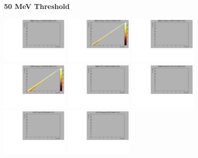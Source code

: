 \textbf{50 MeV Threshold}

\begin{center}

  \includegraphics[width=0.245\textwidth]{plots/response_matrix/Proton_KE_RHC_CC1Pi_50MeV.pdf}
  \includegraphics[width=0.245\textwidth]{plots/response_matrix/PiPlus_KE_RHC_CC1Pi_50MeV.pdf}
  \includegraphics[width=0.245\textwidth]{plots/response_matrix/PiMinus_KE_RHC_CC1Pi_50MeV.pdf}
  \includegraphics[width=0.245\textwidth]{plots/response_matrix/Charged_Pi_KE_RHC_CC1Pi_50MeV.pdf}
  \includegraphics[width=0.245\textwidth]{plots/response_matrix/Pi0_KE_RHC_CC1Pi_50MeV.pdf}
  \includegraphics[width=0.245\textwidth]{plots/response_matrix/Proton+Pion_KE_RHC_CC1Pi_50MeV.pdf}
  \includegraphics[width=0.245\textwidth]{plots/response_matrix/Total_RHC_CC1Pi_50MeV.pdf}
  \includegraphics[width=0.245\textwidth]{plots/response_matrix/Hadrons_RHC_CC1Pi_50MeV.pdf}

\end{center}

